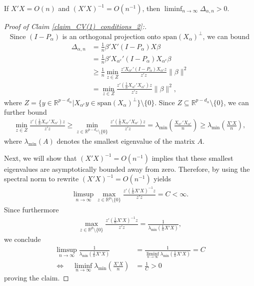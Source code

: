 \documentclass[Research_Module_ES.tex]{subfiles}
\begin{document}
\begin{claim}\label{claim_CV(1)_conditions_2}
	If $X'X=O(n)$ and $(X'X)^{-1}=O(n^{-1})$, then $\liminf_{n\to \infty} \Delta_{\alpha,n} >0$.
\end{claim}
\begin{proof}[Proof of Claim \ref{claim_CV(1)_conditions_2}:]~\\~
Since $(I-P_\alpha)$ is an orthogonal projection onto $\mathrm{span}(X_\alpha)^\bot$, we can bound
\begin{align*}
\Delta_{\alpha,n} 
&= \frac{1}{n}\beta'X'(I-P_\alpha)X\beta\\
&= \frac{1}{n}\beta'X_{\alpha^c}'(I-P_\alpha)X_{\alpha^c}\beta\\
&\ge \frac{1}{n}\min_{z\in Z}\frac{z'X_{\alpha^c}'(I-P_\alpha)X_{\alpha^c}z}{z'z}\lVert\beta \rVert^2\\
&= \min_{z\in Z}\frac{z'(\frac{1}{n}X_{\alpha^c}'X_{\alpha^c})z}{z'z}\lVert\beta \rVert^2,
\end{align*}
where $Z=\{y\in \mathbb{R}^{p-d_\alpha}|X_{\alpha^c}y\in \mathrm{span}(X_\alpha)^\bot\}\setminus \{0\}$. Since $Z\subseteq \mathbb{R}^{p-d_\alpha}\setminus \{0\}$, we can further bound
\begin{align*}
\min_{z\in Z}\frac{z'(\frac{1}{n}X_{\alpha^c}'X_{\alpha^c})z}{z'z} 
\ge \min_{z\in \mathbb{R}^{p-d_\alpha}\setminus \{0\} }\frac{z'(\frac{1}{n}X_{\alpha^c}'X_{\alpha^c})z}{z'z}
= \lambda_{\min}\left(\frac{X_{\alpha^c}'X_{\alpha^c}}{n}\right)
\ge \lambda_{\min}\left(\frac{X'X}{n}\right),
\end{align*}
where $\lambda_{\min}(A)$ denotes the smallest eigenvalue of the matrix $A$.

Next, we will show that $(X'X)^{-1}=O(n^{-1})$ implies that these smallest eigenvalues are asymptotically bounded away from zero. Therefore, by using the spectral norm to rewrite $(X'X)^{-1}=O(n^{-1})$ yields 
\begin{align*}
\limsup_{n\to \infty} \max_{z\in \mathbb{R}^p\setminus \{0\}} \frac{z'(\frac{1}{n}X'X)^{-1}z}{z'z}=C <\infty.
\end{align*}
Since furthermore 
\begin{align*}
\max_{z\in \mathbb{R}^p\setminus \{0\}} \frac{z'(\frac{1}{n}X'X)^{-1}z}{z'z} = \frac{1}{\lambda_{\min}(\frac{1}{n}X'X)},
\end{align*}
we conclude
\begin{align*}
\limsup_{n\to\infty} \frac{1}{\lambda_{\min}(\frac{1}{n}X'X)} &= \frac{1}{\liminf_{n\to\infty}\lambda_{\min}(\frac{1}{n}X'X)}=C\\
\iff \quad \liminf_{n\to\infty}\lambda_{\min}\left(\frac{X'X}{n}\right) &= \frac{1}{C} > 0
\end{align*}
proving the claim.
\end{proof}
\end{document}
